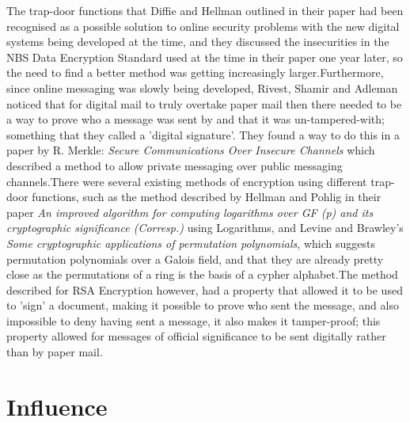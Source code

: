 \documentclass{article}
\begin{document}
The trap-door functions that Diffie and Hellman outlined in their paper\cite{diffie1976new} had been recognised as a possible solution to online security problems with the new digital systems being developed at the time, and they discussed the insecurities in the NBS Data Encryption Standard used at the time in their paper one year later\cite{diffie1977special}, so the need to find a better method was getting increasingly larger.\newline Furthermore, since online messaging was slowly being developed, Rivest, Shamir and Adleman noticed that for digital mail to truly overtake paper mail then there needed to be a way to prove who a message was sent by and that it was un-tampered-with; something that they called a 'digital signature'. They found a way to do this in a paper by R. Merkle: \textit{Secure Communications Over Insecure Channels} which described a method to allow private messaging over public messaging channels\cite{merkle1978secure}.\newline There were several existing methods of encryption using different trap-door functions, such as the method described by Hellman and Pohlig in their paper \textit{An improved algorithm for computing logarithms over GF (p) and its cryptographic significance (Corresp.)}\cite{pohlig1978improved} using Logarithms, and Levine and Brawley's \textit{Some cryptographic applications of permutation polynomials}\cite{levine1977some}, which suggests permutation polynomials over a Galois field, and that they are already pretty close as the permutations of a ring is the basis of a cypher alphabet.\newline The method described for RSA Encryption however, had a property that allowed it to be used to 'sign' a document, making it possible to prove who sent the message, and also impossible to deny having sent a message, it also makes it tamper-proof; this property allowed for messages of official significance to be sent digitally rather than by paper mail.

\section{Influence}
\end{document}
